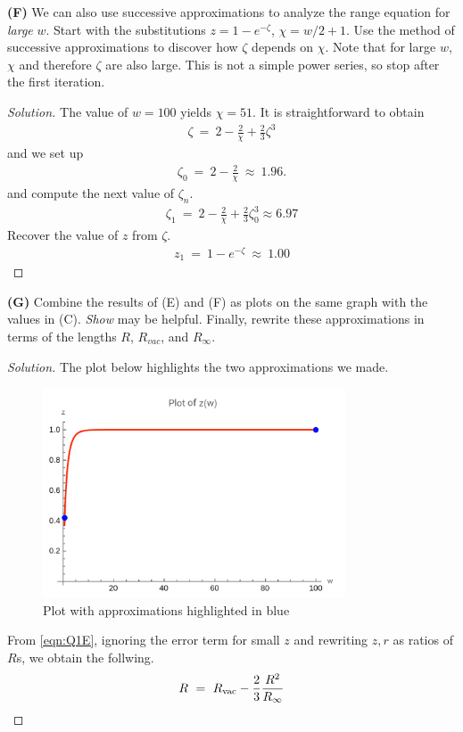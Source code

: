 \documentclass{article}
\numberwithin{equation}{section}
\begin{document}
\textbf{(F)} We can also use successive approximations to analyze the range equation for \textit{large} $w$. Start with the substitutions $z = 1 - e^{-\zeta}$, $\chi = w/2 + 1$. Use the method of successive approximations to discover how $\zeta$ depends on $\chi$. Note that for large $w$, $\chi$ and therefore $\zeta$ are also large. This is not a simple power series, so stop after the first iteration.

\begin{proof}[Solution]
The value of $w = 100$ yields $\chi = 51$. 
    It is straightforward to obtain 
    \begin{eqnarray}
        \zeta \ = \ 2 - \frac 2 \chi + \frac 2 3 \zeta^3
    \end{eqnarray}
    and we set up 
    \begin{eqnarray}
        \zeta_0 \ = \ 2 - \frac 2 \chi \ \approx \ 1.96. 
    \end{eqnarray}
    and compute the next value of $\zeta_n$. 
 \begin{eqnarray}
        \zeta_1 \ = \ 2 - \frac 2 \chi + \frac 2 3 \zeta_0^3 \approx 6.97
    \end{eqnarray}
    Recover the value of $z$ from $\zeta$. 
    \begin{eqnarray}
        z_1 \ = \ 1-e^{-\zeta} \ \approx \ 1.00
    \end{eqnarray}
\end{proof}

\textbf{(G)} Combine the results of (E) and (F) as plots on the same graph with the values in (C). \textit{Show} may be helpful. Finally, rewrite these approximations in terms of the lengths $R$, $R_{vac}$, and $R_{\infty}$.
\begin{proof}[Solution]
The plot below highlights the two approximations we made. 
\begin{figure}[h]
    \centering
    \includegraphics[width=0.8\textwidth]{Q1Dlarge.png} %
    \caption{Plot with approximations highlighted in blue }
    \label{fig:example}
\end{figure}

From \eqref{eqn:Q1E}, ignoring the error term for small $z$ and 
rewriting $z, r$ as ratios of $R$s, we obtain the follwing. 
\begin{eqnarray}
    R \ =\ R_{\rm vac} - \frac 2 3 \frac{R^2}{R_\infty}
\end{eqnarray}
\end{proof}
\end{document}
